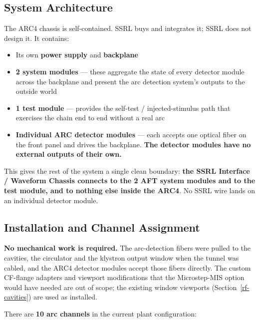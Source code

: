\subsection{System Architecture}\label{arc-architecture}

The ARC4 chassis is self-contained. SSRL buys and integrates it; SSRL does not design it. It contains:

\begin{itemize}
\tightlist
\item
  Its own \textbf{power supply} and \textbf{backplane}
\item
  \textbf{2 system modules} --- these aggregate the state of every detector module across the backplane and present the arc detection system's outputs to the outside world
\item
  \textbf{1 test module} --- provides the self-test / injected-stimulus path that exercises the chain end to end without a real arc
\item
  \textbf{Individual ARC detector modules} --- each accepts one optical fiber on the front panel and drives the backplane. \textbf{The detector modules have no external outputs of their own.}
\end{itemize}

This gives the rest of the system a single clean boundary: \textbf{the SSRL Interface / Waveform Chassis connects to the 2 AFT system modules and to the test module, and to nothing else inside the ARC4}. No SSRL wire lands on an individual detector module.

\subsection{Installation and Channel Assignment}\label{arc-installation}

\textbf{No mechanical work is required.} The arc-detection fibers were pulled to the cavities, the circulator and the klystron output window when the tunnel was cabled, and the ARC4 detector modules accept those fibers directly. The custom CF-flange adapters and viewport modifications that the Microstep-MIS option would have needed are out of scope; the existing window viewports (Section~\ref{rf-cavities}) are used as installed.

There are \textbf{10 arc channels} in the current plant configuration:

